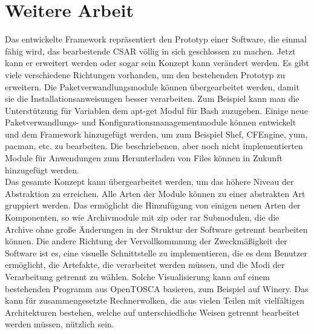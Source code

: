 \section*{Weitere Arbeit}
Das entwickelte Framework repräsentiert den Prototyp einer Software, die einmal fähig wird, das bearbeitende CSAR völlig in sich geschlossen zu machen. 
Jetzt kann er erweitert werden oder sogar sein Konzept kann verändert werden. 
Es gibt viele verschiedene Richtungen vorhanden, um den bestehenden Prototyp zu erweitern. 
Die Paketverwandlungsmodule können übergearbeitet werden, damit sie die Installationsanweisungen besser verarbeiten. 
Zum Beispiel kann man die Unterstützung für Variablen dem apt-get Modul für Bash zuzugeben. 
Einige neue Paketverwandlungs- und Konfigurationsmanagementmodule können entwickelt und dem Framework hinzugefügt werden, um zum Beispiel Shef, CFEngine, yum, pacman, etc. zu bearbeiten. 
Die beschriebenen, aber noch nicht implementierten Module für Anwendungen zum Herunterladen von Files können in Zukunft hinzugefügt werden.\\
Das gesamte Konzept kann übergearbeitet werden, um das höhere Niveau der Abstraktion zu erreichen. 
Alle Arten der Module können zu einer abstrakten Art gruppiert werden. 
Das ermöglicht die Hinzufügung von einigen neuen Arten der Komponenten, so wie Archivmodule mit zip oder rar Submodulen, die die Archive ohne große Änderungen in der Struktur der Software getrennt bearbeiten können. 
Die andere Richtung der Vervollkommnung der Zweckmäßigkeit der Software ist es, eine visuelle Schnittstelle zu implementieren, die es dem Benutzer ermöglicht, die Artefakte, die verarbeitet werden müssen, und die Modi der Verarbeitung getrennt zu wählen. 
Solche Visualisierung kann auf einem bestehenden Programm aus OpenTOSCA basieren, zum Beispiel auf Winery. 
Das kann für zusammengesetzte Rechnerwolken, die aus vielen Teilen mit vielfältigen Architekturen bestehen, welche auf unterschiedliche Weisen getrennt bearbeitet werden müssen, nützlich sein. 
\fi